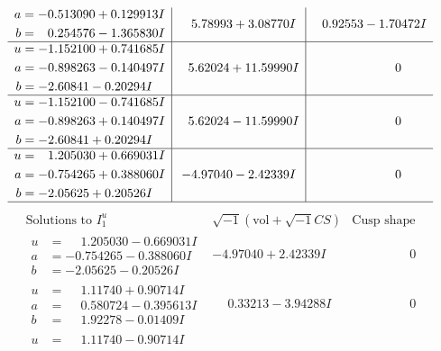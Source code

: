 \documentclass[1p]{elsarticle_modified}
\theoremstyle{definition}
\newcommand{\I}{\sqrt{-1}}
\begin{document}
$$\begin{array}{c|c|c}
\begin{aligned}
a &= -0.513090 + 0.129913 I \\
b &= \phantom{-}0.254576 - 1.365830 I\end{aligned}
 & \phantom{-}5.78993 + 3.08770 I & \phantom{-}0.92553 - 1.70472 I \\ \hline\begin{aligned}
u &= -1.152100 + 0.741685 I \\
a &= -0.898263 - 0.140497 I \\
b &= -2.60841 - 0.20294 I\end{aligned}
 & \phantom{-}5.62024 + 11.59990 I & \phantom{-0.000000 } 0 \\ \hline\begin{aligned}
u &= -1.152100 - 0.741685 I \\
a &= -0.898263 + 0.140497 I \\
b &= -2.60841 + 0.20294 I\end{aligned}
 & \phantom{-}5.62024 - 11.59990 I & \phantom{-0.000000 } 0 \\ \hline\begin{aligned}
u &= \phantom{-}1.205030 + 0.669031 I \\
a &= -0.754265 + 0.388060 I \\
b &= -2.05625 + 0.20526 I\end{aligned}
 & -4.97040 - 2.42339 I & \phantom{-0.000000 } 0\\
 \hline 
 \end{array}$$\newpage$$\begin{array}{c|c|c}  
\text{Solutions to }I^u_{1}& \I (\text{vol} + \sqrt{-1}CS) & \text{Cusp shape}\\
 \hline 
\begin{aligned}
u &= \phantom{-}1.205030 - 0.669031 I \\
a &= -0.754265 - 0.388060 I \\
b &= -2.05625 - 0.20526 I\end{aligned}
 & -4.97040 + 2.42339 I & \phantom{-0.000000 } 0 \\ \hline\begin{aligned}
u &= \phantom{-}1.11740 + 0.90714 I \\
a &= \phantom{-}0.580724 - 0.395613 I \\
b &= \phantom{-}1.92278 - 0.01409 I\end{aligned}
 & \phantom{-}0.33213 - 3.94288 I & \phantom{-0.000000 } 0 \\ \hline\begin{aligned}
u &= \phantom{-}1.11740 - 0.90714 I \\

\end{aligned}
\end{array}$$
\end{document}
